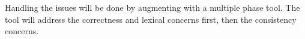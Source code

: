 Handling the {\bibtex} issues will be done by augmenting {\bibtex}
with a multiple phase tool.  The tool will address the correctness and
lexical concerns first, then the consistency concerns.






